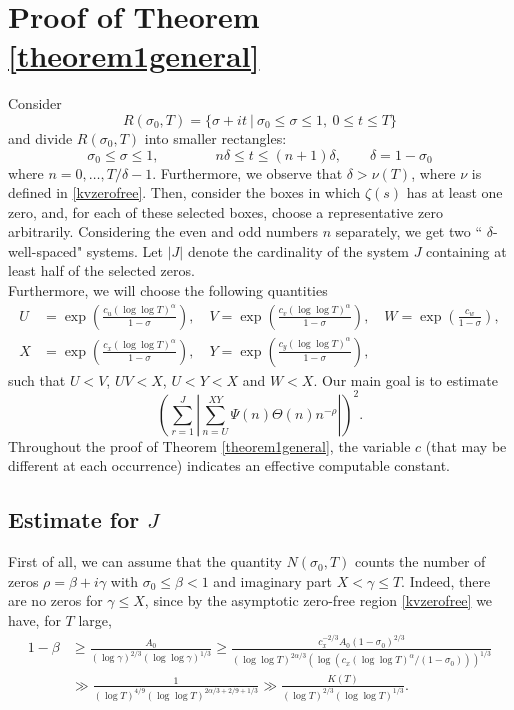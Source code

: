 \documentclass[reqno]{amsart}
\numberwithin{equation}{section}
\theoremstyle{remark}
\begin{document}
\section{Proof of Theorem \ref{theorem1general}}
Consider
\[
R(\sigma_0,T)=\{\sigma+it\ |\ \sigma_0\le\sigma\le 1,\ 0\le t\le T\}
\]
and divide $R(\sigma_0,T)$ into smaller rectangles:
\begin{equation}\label{rectangles}
\sigma_0\le \sigma\le 1,\qquad\qquad n\delta\le t\le (n+1)\delta,\qquad \delta=1-\sigma_0  
\end{equation}
where $n=0,\dots, T/\delta-1$. Furthermore, we observe that $\delta>\nu(T)$, where $\nu$ is defined in \eqref{kvzerofree}.
Then, consider the boxes in which $\zeta(s)$ has at least one zero, and, for each of these selected boxes, choose a representative zero arbitrarily. Considering the even and odd numbers $n$ separately, we get two `` $\delta$-well-spaced" systems. Let $|J|$ denote the cardinality of the system $J$ containing at least half of the selected zeros.\\
Furthermore, we will choose the following quantities
\begin{equation}\label{parameters}
\begin{aligned}
     U&=\exp\left(\frac{c_u(\log\log T)^{\alpha}}{1-\sigma}\right),\quad V=\exp\left(\frac{c_v(\log\log T)^{\alpha}}{1-\sigma}\right),\quad W=\exp\left(\frac{c_w}{1-\sigma}\right),\\X&=\exp\left(\frac{c_x(\log\log T)^{\alpha}}{1-\sigma}\right),\quad Y=\exp\left(\frac{c_y(\log\log T)^{\alpha}}{1-\sigma}\right),
\end{aligned}
\end{equation}
such that $U<V$, $UV<X$, $U<Y<X$ and $W<X$. Our main goal is to estimate 
\begin{equation}\label{principal}
    \left(\sum_{r=1}^J\left|\sum_{n=U}^{XY}\Psi(n)\Theta(n) n^{-\rho}\right|\right)^2.
\end{equation}
Throughout the proof of Theorem \ref{theorem1general}, the variable $c$ (that may be different at each occurrence) indicates an effective computable constant.
\subsection{Estimate for $J$} First of all, we can assume that the quantity $N(\sigma_0,T)$ counts the number of zeros  $\rho=\beta+i\gamma$ with $\sigma_0\le \beta<1$ and imaginary part $X< \gamma\le T$. Indeed,  there are no zeros for $\gamma\le X$, since by the asymptotic zero-free region \eqref{kvzerofree} we have, for $T$ large,
\begin{align*}
    1-\beta&\ge\frac{A_0}{(\log \gamma)^{2/3}(\log\log \gamma)^{1/3}}\ge \frac{c_x^{-2/3}A_0(1-\sigma_0)^{2/3}}{(\log \log T)^{2\alpha/3}(\log(c_x(\log\log T)^{\alpha}/(1-\sigma_0)))^{1/3}}\\&\gg \frac{1
    }{(\log T)^{4/9}(\log \log T)^{2\alpha/3+2/9+1/3}}\gg \frac{K(T)}{(\log T)^{2/3}(\log\log T)^{1/3}}.
\end{align*}
\end{document}
